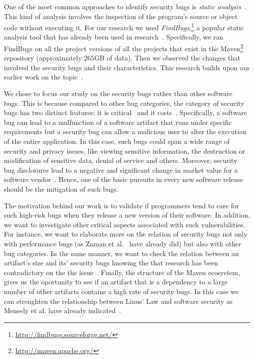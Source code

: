 \documentclass[conference]{IEEEtran}
\begin{document}
One of the most common approaches to identify security bugs is
{\it static analysis}~\cite{CW07}. This kind of analysis involves the
inspection of the program's source or object code without executing
it. For our research we used {\it FindBugs},\footnote{\url{http://findbugs.sourceforge.net/}}
a popular static analysis tool that has already been used in
research~\cite{AP10, HP07, HP04}. Specifically, we ran FindBugs on all the project
versions of all the projects that exist in the Maven\footnote{\url{http://maven.apache.org/}}
repository (approximately 265GB of data). Then we observed the changes that
involved the security bugs and their characteristics. This research builds upon
our earlier work on the topic~\cite{MGS12}.

We chose to focus our study on the security bugs rather than other
software bugs. This is because compared to other bug categories,
the category of security bugs has two distinct features: it is critical~\cite{SZ12}
and it costs~\cite{BCL08}. Specifically, a software bug can
lead to a mulfunction of a software artifact that runs under specific
requirements but a security bug can allow a malicious user to alter the execution
of the entire application. In this case, such bugs could span a wide
range of security and privacy issues, like viewing sensitive information, the destruction or
modification of sensitive data, denial of service and others.
Moreover, security bug disclosures lead to a negative and significant change
in market value for a software vendor~\cite{TW07}.
Hence, one of the basic pursuits in every new software release should
be the mitigation of such bugs.

The motivation behind our work is to validate if programmers tend to care for
such high-risk bugs when they release a new version of their software. In
addition, we want to investigate other critical aspects associated with such
vulnerabilities. For instance, we want to elaborate more on the relation of security
bugs not only with performance bugs (as Zaman et al.~\cite{ZAH11} have already
did) but also with other bug categories. In the same manner, we want to check
the relation between an artifact's size and its' security bugs knowing the
that research has been contradictory on the the issue~\cite{BP84, SYTP85,
NBZ06, GKMS00}.
Finally, the structure of the Maven ecosystem, gives us the oportunity to see
if an artifact that is a dependency to a large number of other artifacts
contains a high rate of security bugs. In this case
we can strenghten the relationship between Linus' Law and software security as
Meneely et al. have already indicated~\cite{MW10}.
\end{document}
